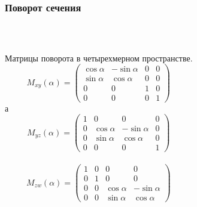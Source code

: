 \documentclass[10pt,pdf,hyperref={unicode}]{beamer}
\begin{document}
\begin{frame}
	\frametitle{Поворот сечения}	\\

	\begin{columns}
	\begin{block}{Матрицы поворота в четырехмерном пространстве.}
		{\footnotesize
			$$
			M_{xy}(\alpha)=
			\left(
			\begin{array}{cccc}
				\cos \alpha & -\sin \alpha & 0 & 0 \\
				\sin \alpha & \cos \alpha & 0 & 0 \\
				0 & 0 & 1 & 0 \\
				0 & 0 & 0 & 1
			\end{array}\right)
			$$			а\\
			
			\newline
			$$
			M_{yz}(\alpha)=
			\left(
			\begin{array}{cccc}
				1 & 0 & 0 & 0 \\
				0 & \cos \alpha & -\sin \alpha & 0 \\
				0 & \sin \alpha & \cos \alpha & 0 \\
				0 & 0 & 0 & 1
			\end{array}\right)
			$$			\\ 

			$$
			M_{zw}(\alpha)=
			\left(
			\begin{array}{cccc}
				1 & 0 & 0 & 0 \\
				0 & 1 & 0 & 0 \\
				0 & 0 & \cos \alpha & -\sin \alpha \\
				0 & 0 & \sin \alpha & \cos \alpha
			\end{array}\right)
			$$
		}

\end{block}
\end{columns}
\end{frame}
\end{document}
